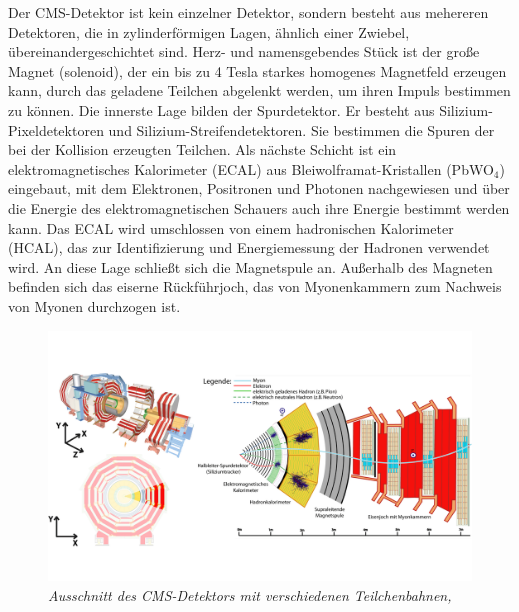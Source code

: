 Der CMS-Detektor ist kein einzelner Detektor, sondern besteht aus mehereren Detektoren, die in zylinderf\"ormigen Lagen, \"ahnlich einer Zwiebel, \"ubereinandergeschichtet sind. Herz- und namensgebendes St\"uck ist der gro\ss e Magnet (solenoid), der ein bis zu \num{4} Tesla starkes homogenes Magnetfeld erzeugen kann, durch das geladene Teilchen abgelenkt werden, um ihren Impuls bestimmen zu k\"onnen. Die innerste Lage bilden der Spurdetektor. Er besteht aus Silizium-Pixeldetektoren und Silizium-Streifendetektoren. Sie bestimmen die Spuren der bei der Kollision erzeugten Teilchen. Als n\"achste Schicht ist ein elektromagnetisches Kalorimeter (ECAL) aus Bleiwolframat-Kristallen (PbWO$_4$) eingebaut, mit dem Elektronen, Positronen und Photonen nachgewiesen und \"uber die Energie des elektromagnetischen Schauers auch ihre Energie bestimmt werden kann. Das ECAL wird umschlossen von einem hadronischen Kalorimeter (HCAL), das zur Identifizierung und Energiemessung der Hadronen verwendet wird. An diese Lage schlie\ss t sich die Magnetspule an. Au\ss erhalb des Magneten befinden sich das eiserne R\"uckf\"uhrjoch, das von Myonenkammern zum Nachweis von Myonen durchzogen ist.\\

\begin{figure}[hhh]
 \begin{center}
   \includegraphics[width=\textwidth]{graphics/cms_slice.png}
   \parbox[b]{12cm}{
     \caption[CMS-Detektor]
             {\label{fig:cms_slice} \it\!Ausschnitt des CMS-Detektors mit verschiedenen Teilchenbahnen, \cite{cms_slice}}
   }
 \end{center}
\end{figure}

